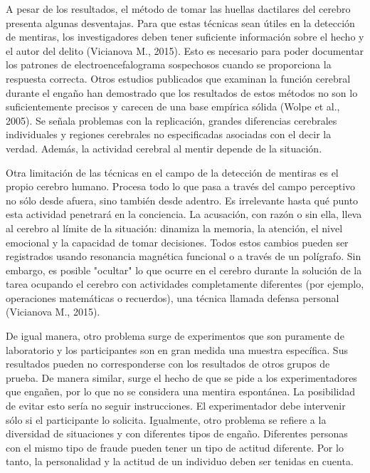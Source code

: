A pesar de los resultados, el método de tomar las huellas dactilares del cerebro presenta algunas desventajas. Para que estas técnicas sean útiles en la detección de mentiras, los investigadores deben tener suficiente información sobre el hecho y el autor del delito (Vicianova M., 2015). Esto es necesario para poder documentar los patrones de electroencefalograma sospechosos cuando se proporciona la respuesta correcta. Otros estudios publicados que examinan la función cerebral durante el engaño han demostrado que los resultados de estos métodos no son lo suficientemente precisos y carecen de una base empírica sólida (Wolpe et al., 2005). Se señala problemas con la replicación, grandes diferencias cerebrales individuales y regiones cerebrales no especificadas asociadas con el decir la verdad. Además, la actividad cerebral al mentir depende de la situación. 

Otra limitación de las técnicas en el campo de la detección de mentiras es el propio cerebro humano. Procesa todo lo que pasa a través del campo perceptivo no sólo desde afuera, sino también desde adentro. Es irrelevante hasta qué punto esta actividad penetrará en la conciencia. La acusación, con razón o sin ella, lleva al cerebro al límite de la situación: dinamiza la memoria, la atención, el nivel emocional y la capacidad de tomar decisiones. Todos estos cambios pueden ser registrados usando resonancia magnética funcional o a través de un polígrafo. Sin embargo, es posible "ocultar" lo que ocurre en el cerebro durante la solución de la tarea ocupando el cerebro con actividades completamente diferentes (por ejemplo, operaciones matemáticas o recuerdos), una técnica llamada defensa personal (Vicianova M., 2015).

De igual manera, otro problema surge de experimentos que son puramente de laboratorio y los participantes son en gran medida una muestra específica. Sus resultados pueden no corresponderse con los resultados de otros grupos de prueba. De manera similar, surge el hecho de que se pide a los experimentadores que engañen, por lo que no se considera una mentira espontánea. La posibilidad de evitar esto sería no seguir instrucciones. El experimentador debe intervenir sólo si el participante lo solicita. Igualmente, otro problema se refiere a la diversidad de situaciones y con diferentes tipos de engaño. Diferentes personas con el mismo tipo de fraude pueden tener un tipo de actitud diferente. Por lo tanto, la personalidad y la actitud de un individuo deben ser tenidas en cuenta.

